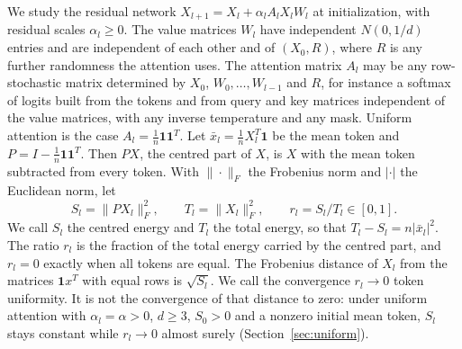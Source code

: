 \documentclass[11pt]{amsart}
\theoremstyle{definition}
\theoremstyle{remark}
\numberwithin{equation}{section}
\begin{document}
We study the residual network $X_{l+1}=X_l+\alpha_lA_lX_lW_l$ at initialization, with residual scales $\alpha_l\ge0$. The value matrices $W_l$ have independent $N(0,1/d)$ entries and are independent of each other and of $(X_0,R)$, where $R$ is any further randomness the attention uses. The attention matrix $A_l$ may be any row-stochastic matrix determined by $X_0$, $W_0,\dots,W_{l-1}$ and $R$, for instance a softmax of logits built from the tokens and from query and key matrices independent of the value matrices, with any inverse temperature and any mask. Uniform attention is the case $A_l=\frac1n\mathbf 1\mathbf 1^{T}$. Let $\bar x_l=\frac1nX_l^{T}\mathbf 1$ be the mean token and $P=I-\frac1n\mathbf 1\mathbf 1^{T}$. Then $PX$, the centred part of $X$, is $X$ with the mean token subtracted from every token. With $\|\cdot\|_F$ the Frobenius norm and $|\cdot|$ the Euclidean norm, let
\[
S_l=\|PX_l\|_F^2,\qquad T_l=\|X_l\|_F^2,\qquad r_l=S_l/T_l\in[0,1].
\]
We call $S_l$ the centred energy and $T_l$ the total energy, so that $T_l-S_l=n|\bar x_l|^2$. The ratio $r_l$ is the fraction of the total energy carried by the centred part, and $r_l=0$ exactly when all tokens are equal. The Frobenius distance of $X_l$ from the matrices $\mathbf 1x^{T}$ with equal rows is $\sqrt{S_l}$. We call the convergence $r_l\to0$ token uniformity. It is not the convergence of that distance to zero: under uniform attention with $\alpha_l=\alpha>0$, $d\ge3$, $S_0>0$ and a nonzero initial mean token, $S_l$ stays constant while $r_l\to0$ almost surely (Section~\ref{sec:uniform}).
\end{document}
